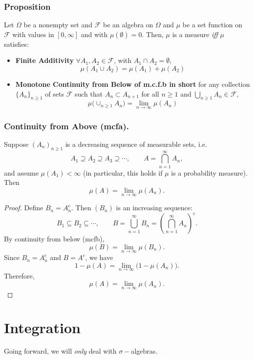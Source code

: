 \documentclass[11pt]{article}
\theoremstyle{definition}
\begin{document}
    \subsubsection{Proposition}
    \label{subsubsec:measures:measure:proposition-iff}
    Let $\Omega$ be a nonempty set and $\mathcal{F}$ be an algebra on $\Omega$ and $\mu$ be a set function on $\mathcal{F}$ with values in $[0, \infty]$ and with $\mu(\emptyset) = 0.$ Then, $\mu$ is a measure \emph{iff} $\mu$ satisfies:
    \begin{itemize}
        \item [$(iii)^i_{a}$] \textbf{Finite Additivity} $\forall A_1, A_2 \in \mathcal{F}$, with $A_1 \cap A_2 = \emptyset$,
        \[\mu(A_1 \cup A_2) = \mu(A_1) + \mu(A_2)\]
        \item [$(iii)^i_{b}$] \textbf{Monotone Continuity from Below of m.c.f.b in short} for any collection $\{A_n\}_{n \geq 1}$ of sets $\mathcal{F}$ such that $A_n \subset A_{n+1}$ for all $n \geq 1$ and $\bigcup_{n \geq 1} A_n \in \mathcal{F},$
        \[\mu \big (\cup_{n \geq 1} A_n \big ) = \lim_{n \to \infty} \mu (A_n)\]
    \end{itemize} 
    


    \subsubsection{Continuity from Above (mcfa).}
    \label{subsubsec:measures:measure:continuity-from-above}
    Suppose $(A_n)_{n \geq 1}$ is a decreasing sequence of measurable sets, i.e.
    \[
    A_1 \supseteq A_2 \supseteq A_3 \supseteq \cdots, 
    \qquad A = \bigcap_{n=1}^\infty A_n,
    \]
    and assume $\mu(A_1) < \infty$ (in particular, this holds if $\mu$ is a probability measure).  
    Then
    \[
    \mu(A) = \lim_{n \to \infty} \mu(A_n).
    \]
    
    \begin{proof}
    Define $B_n = A_n^c$. Then $(B_n)$ is an increasing sequence:
    \[
    B_1 \subseteq B_2 \subseteq \cdots,
    \qquad B = \bigcup_{n=1}^\infty B_n = \left(\bigcap_{n=1}^\infty A_n\right)^c.
    \]
    By continuity from below (mcfb),
    \[
    \mu(B) = \lim_{n \to \infty} \mu(B_n).
    \]
    Since $B_n = A_n^c$ and $B = A^c$, we have
    \[
    1 - \mu(A) = \lim_{n \to \infty} \big(1 - \mu(A_n)\big).
    \]
    Therefore,
    \[
    \mu(A) = \lim_{n \to \infty} \mu(A_n).
    \]
    \end{proof}
\newpage
\section{Integration}
\label{sec:integration}
Going forward, we will \emph{only} deal with $\sigma-$algebras.
\end{document}
